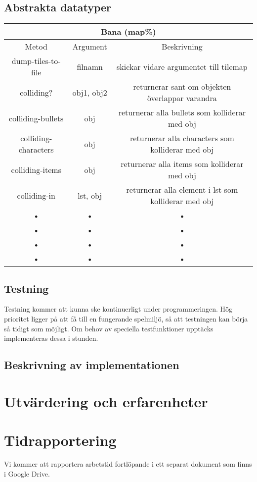 \documentclass{article}
\begin{document}
\subsection{Abstrakta datatyper}
\begin{tabular}{c c c}
\toprule
\multicolumn{3}{c}{Bana (map\%)} \\ 
\midrule
Metod & Argument & Beskrivning \\ 
 
dump-tiles-to-file & filnamn & skickar vidare argumentet till tilemap  \\ 
 
colliding? & obj1, obj2 & returnerar sant om objekten överlappar varandra \\ 
 
colliding-bullets & obj & returnerar alla bullets som kolliderar med obj \\ 
 
colliding-characters & obj & returnerar alla characters som kolliderar med obj \\ 
 
colliding-items & obj & returnerar alla items som kolliderar med obj \\ 
 
colliding-in & lst, obj & returnerar alla element i lst som kolliderar med obj \\ 
 
• & • & • \\ 
 
• & • & • \\ 
 
• & • & • \\ 
 
• & • & • \\ \bottomrule
\end{tabular} 

\subsection{Testning}
Testning kommer att kunna ske kontinuerligt under programmeringen. Hög prioritet ligger på att få till en fungerande spelmiljö, så att testningen kan börja så tidigt som möjligt. Om behov av speciella testfunktioner upptäcks implementeras dessa i stunden.

\subsection{Beskrivning av implementationen}

\section{Utvärdering och erfarenheter}

\section{Tidrapportering}
Vi kommer att rapportera arbetstid fortlöpande i ett separat dokument som finns i Google Drive.
\end{document}
